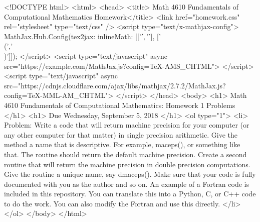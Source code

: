 <!DOCTYPE html>
<html>
<head>
  <title> Math 4610 Fundamentals of Computational Mathematics Homework</title>
  <link href="homework.css" rel="stylesheet" type="text/css" />
  <script type="text/x-mathjax-config">
    MathJax.Hub.Config({tex2jax: {inlineMath: [['$','$'], ['\\(','\\)']]}});
  </script>
  <script type="text/javascript" async
    src="https://example.com/MathJax.js?config=TeX-AMS_CHTML">
  </script>
  <script type="text/javascript" async
    src="https://cdnjs.cloudflare.com/ajax/libs/mathjax/2.7.2/MathJax.js?config=TeX-MML-AM_CHTML">
  </script>
</head>
<body>
  <h1>
    Math 4610 Fundamentals of Computational Mathematics: Homework 1 Problems
  </h1>
  <h1>
    Due Wednesday, September 5, 2018
  </h1>
  <ol type="1">
    <li> Problem: Write a code that will return machine precision for your computer (or any other computer for that matter) in
      single precision arithmetic. Give the method a name that is descriptive. For example, maceps(), or something like that.
      The routine should return the default machine precision. Create a second routine that will return the machine precision
      in double precision computations. Give the routine a unique name, say dmaceps(). Make sure that your code is fully
      documented with you as the author and so on. An example of a Fortran code is included in this repository. You can
      translate this into a Python, C, or C++ code to do the work. You can also modify the Fortran and use this directly.
    </li>
  </ol>
</body>
</html>
